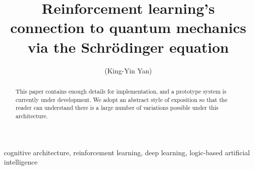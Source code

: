\documentclass[orivec]{llncs}
\title{Reinforcement learning's connection to quantum mechanics via the Schr\"{o}dinger equation}
\author{\usebox{\MyName} (King-Yin Yan)
}
\institute{General.Intelligence@Gmail.com}
\begin{document}
\maketitle

\setlength{\parindent}{0em}
\setlength{\parskip}{2.8ex plus0.8ex minus0.8ex}

\begin{abstract}
This paper contains enough details for implementation, and a prototype system is currently under development.  We adopt an abstract style of exposition so that the reader can understand there is a large number of variations possible under this architecture.
\end{abstract}

\begin{keywords}
cognitive architecture, reinforcement learning, deep learning, logic-based artificial intelligence
\end{keywords}

\end{document}
